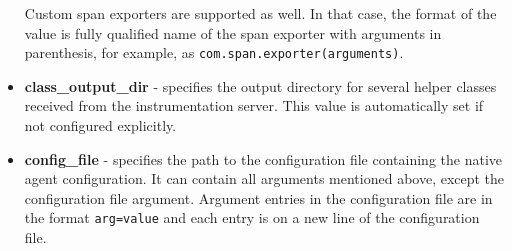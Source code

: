 \begin{itemize}
	Custom span exporters are supported as well. In that case, the format of the value is fully qualified name of the span exporter with arguments in parenthesis, for example, as \texttt{com.span.exporter(arguments)}.
	\item \textbf{class\_output\_dir} - specifies the output directory for several helper classes received from the instrumentation server. This value is automatically set if not configured explicitly.
	\item \textbf{config\_file} - specifies the path to the configuration file containing the native agent configuration. It can contain all arguments mentioned above, except the configuration file argument. Argument entries in the configuration file are in the format \texttt{arg=value} and each entry is on a new line of the configuration file. 
\end{itemize}